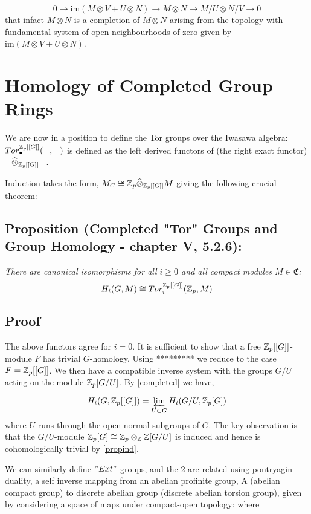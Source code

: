 $$0\rightarrow \text{im}(M\otimes V + U\otimes N)\rightarrow
M\otimes N \rightarrow M/U \otimes N/V\rightarrow 0$$ that infact
$M\widehat\otimes N$ is a completion of $M\otimes
N$ arising from the topology with fundamental system of open
neighbourhoods of zero given by $\text{im}(M\otimes V + U\otimes N)$.








\section{Homology of Completed Group Rings\label{HCGR}}

We are now in a position to define the Tor groups over the Iwasawa
algebra: $Tor^{\mathbb Z_p[[G]]}_\bullet (-,-)$ is defined as the left
derived functors of (the right exact functor)
$-\widehat\otimes_{\mathbb Z_p[[G]]} - $.

Induction takes the form, $M_G \cong \mathbb Z_p
\widehat\otimes_{\mathbb Z_p[[G]]} M$ giving the following crucial
theorem:

\subsection{Proposition (Completed "Tor" Groups and Group Homology - \cite{N} chapter V, 5.2.6):\label{4.6.1}} \emph{There
are canonical isomorphisms for all $i\geq 0$ and all compact
modules $M\in \mathfrak C$: $$H_i (G,M)\cong Tor_i^{\mathbb Z_p[[G]]}
(\mathbb Z_p,M)$$}

\subsection*{Proof}

The above functors agree for $i=0$. It is sufficient to show that a free $\mathbb Z_p[[G]]$-module $F$ has trivial $G$-homology. Using ********* we reduce to the case $F=\mathbb Z_p[[G]]$. We then have a compatible inverse system with the groups $G/U$ acting on the module $\mathbb Z_p[G/U]$. By \ref{completed} we have,

$$H_i(G, \mathbb Z_p[[G]]) =  \varprojlim_{U\subset G} H_i(G/U , \mathbb Z_p [G])$$ where $U$ runs through the open normal subgroups of $G$. The key observation is that the $G/U$-module $\mathbb Z_p[G] \cong \mathbb Z_p\otimes_\mathbb Z \mathbb Z [G/U]$ is induced and hence is cohomologically trivial by \ref{propind}.


We can similarly define $"Ext"$ groups, and the 2 are related using
pontryagin duality, a self inverse mapping from an abelian profinite group, A (abelian compact group) to discrete abelian group (discrete abelian torsion group), given by considering a space of maps under compact-open topology:  where

